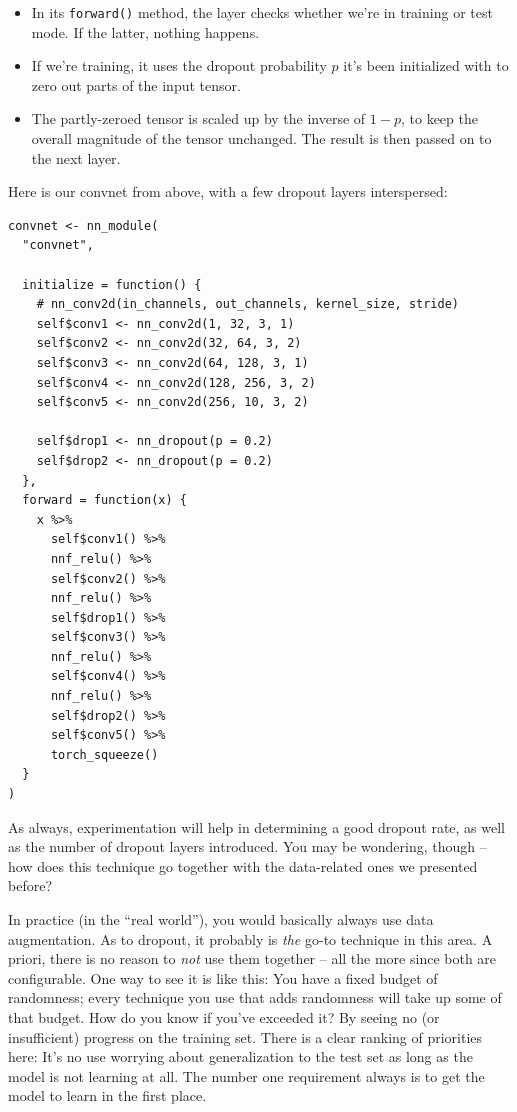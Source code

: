 \documentclass[
  letterpaper,
]{krantz}
\begin{document}
\begin{itemize}
\item
  In its \texttt{forward()} method, the layer checks whether we're in
  training or test mode. If the latter, nothing happens.
\item
  If we're training, it uses the dropout probability \(p\) it's been
  initialized with to zero out parts of the input tensor.
\item
  The partly-zeroed tensor is scaled up by the inverse of \(1-p\), to
  keep the overall magnitude of the tensor unchanged. The result is then
  passed on to the next layer.
\end{itemize}

Here is our convnet from above, with a few dropout layers interspersed:

\begin{verbatim}
convnet <- nn_module(
  "convnet",
  
  initialize = function() {
    # nn_conv2d(in_channels, out_channels, kernel_size, stride)
    self$conv1 <- nn_conv2d(1, 32, 3, 1)
    self$conv2 <- nn_conv2d(32, 64, 3, 2)
    self$conv3 <- nn_conv2d(64, 128, 3, 1)
    self$conv4 <- nn_conv2d(128, 256, 3, 2)
    self$conv5 <- nn_conv2d(256, 10, 3, 2)
    
    self$drop1 <- nn_dropout(p = 0.2)
    self$drop2 <- nn_dropout(p = 0.2)
  },
  forward = function(x) {
    x %>% 
      self$conv1() %>% 
      nnf_relu() %>%
      self$conv2() %>%
      nnf_relu() %>% 
      self$drop1() %>%
      self$conv3() %>% 
      nnf_relu() %>% 
      self$conv4() %>% 
      nnf_relu() %>% 
      self$drop2() %>%
      self$conv5() %>%
      torch_squeeze()
  }
)
\end{verbatim}

As always, experimentation will help in determining a good dropout rate,
as well as the number of dropout layers introduced. You may be
wondering, though -- how does this technique go together with the
data-related ones we presented before?

In practice (in the ``real world''), you would basically always use data
augmentation. As to dropout, it probably is \emph{the} go-to technique
in this area. A priori, there is no reason to \emph{not} use them
together -- all the more since both are configurable. One way to see it
is like this: You have a fixed budget of randomness; every technique you
use that adds randomness will take up some of that budget. How do you
know if you've exceeded it? By seeing no (or insufficient) progress on
the training set. There is a clear ranking of priorities here: It's no
use worrying about generalization to the test set as long as the model
is not learning at all. The number one requirement always is to get the
model to learn in the first place.
\end{document}
